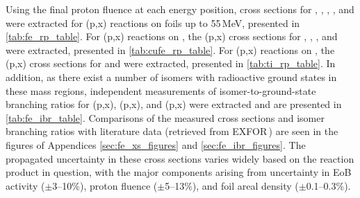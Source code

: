Using the final proton fluence at each energy position, cross sections for , ,  ,   , and 
 were extracted for (p,x) reactions  on  foils up to 55\,MeV, presented in \autoref{tab:fe_rp_table}.
For  (p,x) reactions on , the (p,x) cross sections for  , , ,   and   were extracted, 
presented in \autoref{tab:cufe_rp_table}.
For  (p,x) reactions on , the (p,x) cross sections for   and   were extracted, 
presented in \autoref{tab:ti_rp_table}.
In addition, as there exist a number of isomers with radioactive ground states in these mass regions,  independent measurements of isomer-to-ground-state branching ratios for (p,x), (p,x), and (p,x) were  extracted and are presented in \autoref{tab:fe_ibr_table}.
Comparisons  of the measured cross sections and isomer branching ratios with literature data (retrieved from EXFOR\,\cite{Otuka2014272}) are seen in the figures of Appendices \ref{sec:fe_xs_figures} and \ref{sec:fe_ibr_figures}.
The propagated uncertainty in these cross sections varies widely based on the reaction product in question, with the major components  arising from uncertainty in EoB activity ($\pm$3--10\%), proton fluence ($\pm$5--13\%), and foil areal density ($\pm$0.1--0.3\%).










% 



